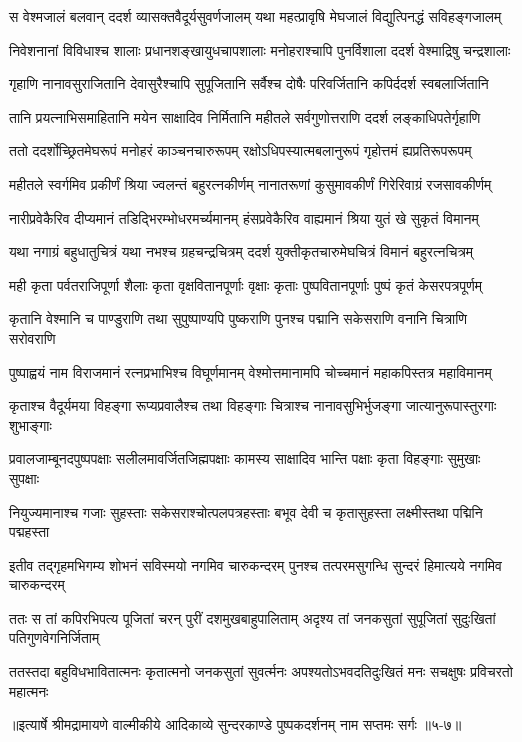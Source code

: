 
\twolineshloka
{स वेश्मजालं बलवान् ददर्श व्यासक्तवैदूर्यसुवर्णजालम्}
{यथा महत्प्रावृषि मेघजालं विद्युत्पिनद्धं सविहङ्गजालम्} %

\twolineshloka
{निवेशनानां विविधाश्च शालाः प्रधानशङ्खायुधचापशालाः}
{मनोहराश्चापि पुनर्विशाला ददर्श वेश्माद्रिषु चन्द्रशालाः} %

\twolineshloka
{गृहाणि नानावसुराजितानि देवासुरैश्चापि सुपूजितानि}
{सर्वैश्च दोषैः परिवर्जितानि कपिर्ददर्श स्वबलार्जितानि} %

\twolineshloka
{तानि प्रयत्नाभिसमाहितानि मयेन साक्षादिव निर्मितानि}
{महीतले सर्वगुणोत्तराणि ददर्श लङ्काधिपतेर्गृहाणि} %

\twolineshloka
{ततो ददर्शोच्छ्रितमेघरूपं मनोहरं काञ्चनचारुरूपम्}
{रक्षोऽधिपस्यात्मबलानुरूपं गृहोत्तमं ह्यप्रतिरूपरूपम्} %

\twolineshloka
{महीतले स्वर्गमिव प्रकीर्णं श्रिया ज्वलन्तं बहुरत्नकीर्णम्}
{नानातरूणां कुसुमावकीर्णं गिरेरिवाग्रं रजसावकीर्णम्} %

\twolineshloka
{नारीप्रवेकैरिव दीप्यमानं तडिद्भिरम्भोधरमर्च्यमानम्}
{हंसप्रवेकैरिव वाह्यमानं श्रिया युतं खे सुकृतं विमानम्} %

\twolineshloka
{यथा नगाग्रं बहुधातुचित्रं यथा नभश्च ग्रहचन्द्रचित्रम्}
{ददर्श युक्तीकृतचारुमेघचित्रं विमानं बहुरत्नचित्रम्} %

\twolineshloka
{मही कृता पर्वतराजिपूर्णा शैलाः कृता वृक्षवितानपूर्णाः}
{वृक्षाः कृताः पुष्पवितानपूर्णाः पुष्पं कृतं केसरपत्रपूर्णम्} %

\twolineshloka
{कृतानि वेश्मानि च पाण्डुराणि तथा सुपुष्पाण्यपि पुष्कराणि}
{पुनश्च पद्मानि सकेसराणि वनानि चित्राणि सरोवराणि} %

\twolineshloka
{पुष्पाह्वयं नाम विराजमानं रत्नप्रभाभिश्च विघूर्णमानम्}
{वेश्मोत्तमानामपि चोच्चमानं महाकपिस्तत्र महाविमानम्} %

\twolineshloka
{कृताश्च वैदूर्यमया विहङ्गा रूप्यप्रवालैश्च तथा विहङ्गाः}
{चित्राश्च नानावसुभिर्भुजङ्गा जात्यानुरूपास्तुरगाः शुभाङ्गाः} %

\twolineshloka
{प्रवालजाम्बूनदपुष्पपक्षाः सलीलमावर्जितजिह्मपक्षाः}
{कामस्य साक्षादिव भान्ति पक्षाः कृता विहङ्गाः सुमुखाः सुपक्षाः} %

\twolineshloka
{नियुज्यमानाश्च गजाः सुहस्ताः सकेसराश्चोत्पलपत्रहस्ताः}
{बभूव देवी च कृतासुहस्ता लक्ष्मीस्तथा पद्मिनि पद्महस्ता} %

\twolineshloka
{इतीव तद्गृहमभिगम्य शोभनं सविस्मयो नगमिव चारुकन्दरम्}
{पुनश्च तत्परमसुगन्धि सुन्दरं हिमात्यये नगमिव चारुकन्दरम्} %

\twolineshloka
{ततः स तां कपिरभिपत्य पूजितां चरन् पुरीं दशमुखबाहुपालिताम्}
{अदृश्य तां जनकसुतां सुपूजितां सुदुःखितां पतिगुणवेगनिर्जिताम्} %

\twolineshloka
{ततस्तदा बहुविधभावितात्मनः कृतात्मनो जनकसुतां सुवर्त्मनः}
{अपश्यतोऽभवदतिदुःखितं मनः सचक्षुषः प्रविचरतो महात्मनः} %


॥इत्यार्षे श्रीमद्रामायणे वाल्मीकीये आदिकाव्ये सुन्दरकाण्डे पुष्पकदर्शनम् नाम सप्तमः सर्गः ॥५-७॥
